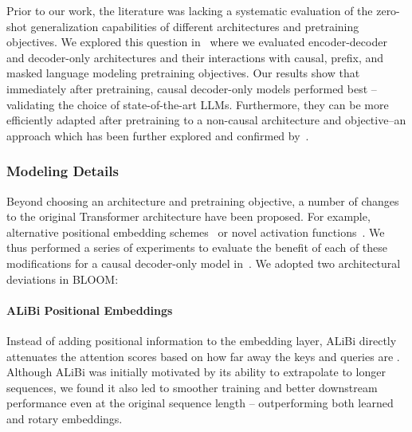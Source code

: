 \documentclass[twoside,11pt]{article}
\begin{document}
Prior to our work, the literature was lacking a systematic evaluation of the zero-shot generalization capabilities of different architectures and pretraining objectives. 
We explored this question in~\citet{wang2022what} where we evaluated encoder-decoder and
decoder-only architectures and their interactions with causal, prefix, and masked language modeling pretraining objectives. 
Our results show that immediately after pretraining, causal decoder-only models performed best -- validating the choice of state-of-the-art LLMs. Furthermore, they can be more efficiently adapted after pretraining to a non-causal architecture and objective--an approach which has been further explored and confirmed by~\citet{tay2022transcending}.


\subsubsection{Modeling Details}

Beyond choosing an architecture and pretraining objective, a number of changes to the original Transformer architecture have been proposed. For example, alternative positional embedding schemes~\citep{su2021roformer, press2021train} or novel activation functions~\citep{shazeer2020glu}. We thus performed a series of experiments to evaluate the benefit of each of these modifications for a causal decoder-only model in~\citet{scao2022what}. We adopted two architectural deviations in BLOOM:

\paragraph{ALiBi Positional Embeddings} Instead of adding positional information to the embedding layer, ALiBi directly attenuates the attention scores based on how far away the keys and queries are \citep{press2021train}. Although ALiBi was initially motivated by its ability to extrapolate to longer sequences, we found it also led to smoother training and better downstream performance even at the original sequence length -- outperforming both learned \citep{vaswani2017attention} and rotary \citep{su2021roformer} embeddings.
\end{document}
